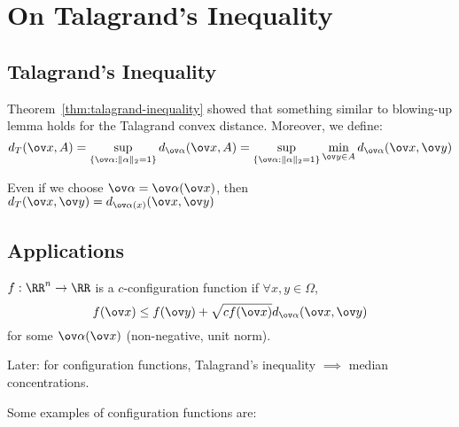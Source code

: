 \chapter{On Talagrand's Inequality}
\section{Talagrand's Inequality}
Theorem~\ref{thm:talagrand-inequality} showed that something similar to blowing-up lemma holds for the Talagrand convex distance. Moreover, we define:
\[
d_T(\ov x, A) = \sup_{\{\ov\alpha: \|\alpha\|_2 = 1\}} d_{\ov\alpha}(\ov x, A) =  \sup_{\{\ov\alpha: \|\alpha\|_2 = 1\}} \min_{\ov y \in A}d_{\ov\alpha} (\ov x, \ov y)
 \]
 \begin{note}
Even if we choose $\ov\alpha = \ov\alpha(\ov x)$, then $d_T(\ov x, \ov y) = d_{\ov\alpha(x)} (\ov x, \ov y)$
 \end{note}
 \section{Applications}
 \begin{definition}\label{def:config-function}
$f:\RR^n \to \RR$ is a $c$-configuration function if $\forall x,y \in \Omega$,
\begin{equation}
    f(\ov x) \leq f(\ov y) + \sqrt{c f(\ov x)} d_{\ov \alpha} (\ov x, \ov y)
\end{equation}
for some $\ov \alpha (\ov x)$ (non-negative, unit norm).
\end{definition} 
\begin{remark}
Later: for configuration functions, Talagrand's inequality $\implies$ median concentrations. 
\end{remark}
Some examples of configuration functions are:
